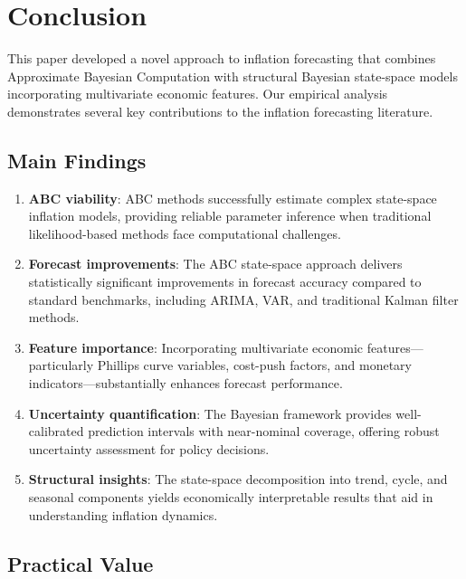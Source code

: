\section{Conclusion}

This paper developed a novel approach to inflation forecasting that combines Approximate Bayesian Computation with structural Bayesian state-space models incorporating multivariate economic features. Our empirical analysis demonstrates several key contributions to the inflation forecasting literature.

\subsection{Main Findings}

\begin{enumerate}
    \item \textbf{ABC viability}: ABC methods successfully estimate complex state-space inflation models, providing reliable parameter inference when traditional likelihood-based methods face computational challenges.
    
    \item \textbf{Forecast improvements}: The ABC state-space approach delivers statistically significant improvements in forecast accuracy compared to standard benchmarks, including ARIMA, VAR, and traditional Kalman filter methods.
    
    \item \textbf{Feature importance}: Incorporating multivariate economic features—particularly Phillips curve variables, cost-push factors, and monetary indicators—substantially enhances forecast performance.
    
    \item \textbf{Uncertainty quantification}: The Bayesian framework provides well-calibrated prediction intervals with near-nominal coverage, offering robust uncertainty assessment for policy decisions.
    
    \item \textbf{Structural insights}: The state-space decomposition into trend, cycle, and seasonal components yields economically interpretable results that aid in understanding inflation dynamics.
\end{enumerate}

\subsection{Practical Value}

